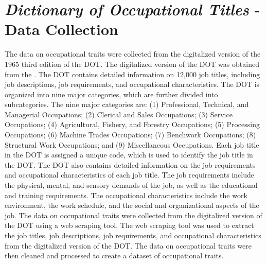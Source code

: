 \documentclass[11pt, a4paper, leqno]{article}
\begin{document}
\section{\textit{Dictionary of Occupational Titles} - Data Collection}
The data on occupational traits were collected from the digitalized version of the 1965 third edition of the DOT. The digitalized version of the DOT was obtained from the . The DOT contains detailed information on 12,000 job titles, including job descriptions, job requirements, and occupational characteristics. The DOT is organized into nine major categories, which are further divided into subcategories. The nine major categories are: (1) Professional, Technical, and Managerial Occupations; (2) Clerical and Sales Occupations; (3) Service Occupations; (4) Agricultural, Fishery, and Forestry Occupations; (5) Processing Occupations; (6) Machine Trades Occupations; (7) Benchwork Occupations; (8) Structural Work Occupations; and (9) Miscellaneous Occupations. Each job title in the DOT is assigned a unique code, which is used to identify the job title in the DOT. The DOT also contains detailed information on the job requirements and occupational characteristics of each job title. The job requirements include the physical, mental, and sensory demands of the job, as well as the educational and training requirements. The occupational characteristics include the work environment, the work schedule, and the social and organizational aspects of the job. The data on occupational traits were collected from the digitalized version of the DOT using a web scraping tool. The web scraping tool was used to extract the job titles, job descriptions, job requirements, and occupational characteristics from the digitalized version of the DOT. The data on occupational traits were then cleaned and processed to create a dataset of occupational traits.













\newpage
\nocite{*}
\printbibliography
\end{document}

